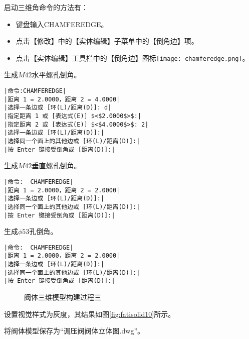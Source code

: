 \begin{procedure}
启动三维角命令的方法有：
\begin{itemize}
\item 键盘输入CHAMFEREDGE。
\item 点击【修改】中的【实体编辑】子菜单中的【倒角边】项。
\item 点击【实体编辑】工具栏中的【倒角边】图标\texttt{[image: chamferedge.png]}。
\end{itemize}
生成$M42$水平螺孔倒角。
\begin{lstlisting}
|命令:CHAMFEREDGE|
|距离 1 = 2.0000，距离 2 = 4.0000|
|选择一条边或 [环(L)/距离(D)]: d|
|指定距离 1 或 [表达式(E)] $<$2.0000$>$:|
|指定距离 2 或 [表达式(E)] $<$4.0000$>$: 2|
|选择一条边或 [环(L)/距离(D)]:|
|选择同一个面上的其他边或 [环(L)/距离(D)]:|
|按 Enter 键接受倒角或 [距离(D)]:|
\end{lstlisting}
生成$M42$垂直螺孔倒角。
\begin{lstlisting}
|命令:  CHAMFEREDGE|
|距离 1 = 2.0000，距离 2 = 2.0000|
|选择一条边或 [环(L)/距离(D)]:|
|选择同一个面上的其他边或 [环(L)/距离(D)]:|
|按 Enter 键接受倒角或 [距离(D)]:|
\end{lstlisting}
生成$\phi 53$孔倒角。
\begin{lstlisting}
|命令:  CHAMFEREDGE|
|距离 1 = 2.0000，距离 2 = 2.0000|
|选择一条边或 [环(L)/距离(D)]:|
|选择同一个面上的其他边或 [环(L)/距离(D)]:|
|按 Enter 键接受倒角或 [距离(D)]:|
\end{lstlisting}
\begin{figure}[htbp]
\centering
{}\hspace{30pt}
\caption{阀体三维模型构建过程三}
\end{figure}
\item 设置视觉样式为灰度，其结果如图\ref{fig:fatisolid10}所示。
\item 将阀体模型保存为“调压阀阀体立体图.dwg”。
\end{procedure}
\endinput